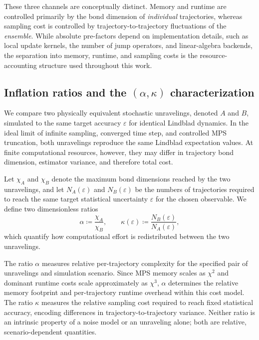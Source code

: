 \documentclass[aps, pra, superscriptaddress, reprint, floatfix]{revtex4-2}
\theoremstyle{plain}
\begin{document}
These three channels are conceptually distinct. Memory and runtime are controlled primarily by the bond dimension of \emph{individual} trajectories, whereas sampling cost is controlled by trajectory-to-trajectory fluctuations of the \emph{ensemble}. While absolute pre-factors depend on implementation details, such as local update kernels, the number of jump operators, and linear-algebra backends, the separation into memory, runtime, and sampling costs is the resource-accounting structure used throughout this work.

\subsection{Inflation ratios and the $(\alpha,\kappa)$ characterization}
We compare two physically equivalent stochastic unravelings, denoted $A$ and $B$, simulated to the same target accuracy $\varepsilon$ for identical Lindblad dynamics. In the ideal limit of infinite sampling, converged time step, and controlled MPS truncation, both unravelings reproduce the same Lindblad expectation values. At finite computational resources, however, they may differ in trajectory bond dimension, estimator variance, and therefore total cost.

Let $\chi_A$ and $\chi_B$ denote the maximum bond dimensions reached by the two unravelings, and let $N_A(\varepsilon)$ and $N_B(\varepsilon)$ be the numbers of trajectories required to reach the same target statistical uncertainty $\varepsilon$ for the chosen observable. We define two dimensionless ratios
\begin{equation}
\alpha \coloneqq \frac{\chi_A}{\chi_B},
\qquad
\kappa(\varepsilon) \coloneqq  \frac{N_B(\varepsilon)}{N_A(\varepsilon)},
\label{eq:alpha_kappa_def}
\end{equation}
which quantify how computational effort is redistributed between the two unravelings.

The ratio $\alpha$ measures relative per-trajectory complexity for the specified pair of unravelings and simulation scenario. Since MPS memory scales as $\chi^2$ and dominant runtime costs scale approximately as $\chi^3$, $\alpha$ determines the relative memory footprint and per-trajectory runtime overhead within this cost model. The ratio $\kappa$ measures the relative sampling cost required to reach fixed statistical accuracy, encoding differences in trajectory-to-trajectory variance. Neither ratio is an intrinsic property of a noise model or an unraveling alone; both are relative, scenario-dependent quantities.
\end{document}
